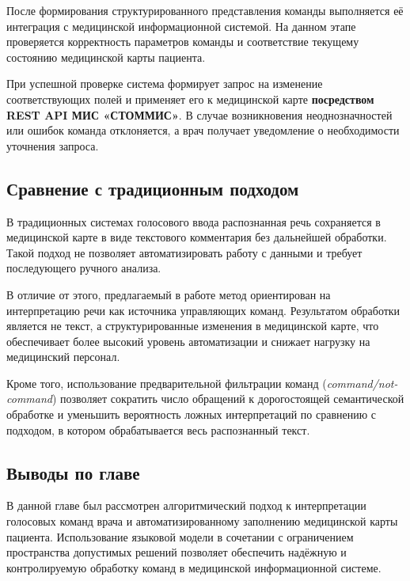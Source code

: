 После формирования структурированного представления команды выполняется её интеграция с медицинской информационной системой. На данном этапе проверяется корректность параметров команды и соответствие текущему состоянию медицинской карты пациента.

При успешной проверке система формирует запрос на изменение соответствующих полей и применяет его к медицинской карте \textbf{посредством REST API МИС «СТОММИС»}. В случае возникновения неоднозначностей или ошибок команда отклоняется, а врач получает уведомление о необходимости уточнения запроса.

\subsection{Сравнение с традиционным подходом}

В традиционных системах голосового ввода распознанная речь сохраняется в медицинской карте в виде текстового комментария без дальнейшей обработки. Такой подход не позволяет автоматизировать работу с данными и требует последующего ручного анализа.

В отличие от этого, предлагаемый в работе метод ориентирован на интерпретацию речи как источника управляющих команд. Результатом обработки является не текст, а структурированные изменения в медицинской карте, что обеспечивает более высокий уровень автоматизации и снижает нагрузку на медицинский персонал.

Кроме того, использование предварительной фильтрации команд (\textit{command/not-command}) позволяет сократить число обращений к дорогостоящей семантической обработке и уменьшить вероятность ложных интерпретаций по сравнению с подходом, в котором обрабатывается весь распознанный текст.
\subsection{Выводы по главе}

В данной главе был рассмотрен алгоритмический подход к интерпретации голосовых команд врача и автоматизированному заполнению медицинской карты пациента. Использование языковой модели в сочетании с ограничением пространства допустимых решений позволяет обеспечить надёжную и контролируемую обработку команд в медицинской информационной системе.
